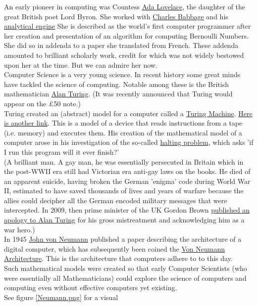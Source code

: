 \documentclass{article}
\begin{document}
An early pioneer in computing was Countess \href{https://en.wikipedia.org/wiki/Ada_Lovelace}{Ada Lovelace}, the daughter of the great British poet Lord Byron.  She worked with \href{https://en.wikipedia.org/wiki/Charles_Babbage}{Charles Babbage} and his \href{https://en.wikipedia.org/wiki/Analytical_Engine}{analytical engine}  She is described as the world's first computer programmer after her creation and presentation of an algorithm for computing Bernoulli Numbers.  She did so in addenda to a paper she translated from French.  These addenda amounted to brilliant scholarly work, credit for which was not widely bestowed upon her at the time.  But we can admire her now.
\\
Computer Science is a very young science.  In recent history some great minds have tackled the science of computing.  Notable among these is the British mathematician \href{https://www.britannica.com/biography/Alan-Turing}{Alan Turing}.  (It was recently announced that Turing would appear on the £50 note.)
\\
Turing created an (abstract) model for a computer called a \href{https://en.wikipedia.org/wiki/Turing_machine}{Turing Machine}. \href{https://www.cl.cam.ac.uk/projects/raspberrypi/tutorials/turing-machine/one.html}{Here is another link}.  This is a model of a device that reads instructions from a tape (i.e. memory) and executes them.  His creation of the mathematical model of a computer arose in his investigation of the so-called \href{https://en.wikipedia.org/wiki/Halting_problem}{halting problem}, which asks 'if I run this program will it ever finish?'
\\
(A brilliant man.  A gay man, he was essentially persecuted in Britain which in the post-WWII era still had Victorian era anti-gay laws on the books.  He died of an apparent suicide, having broken the German 'enigma' code during World War II, estimated to have saved thousands of lives and years of warfare because the allies could decipher all the German encoded military messages that were intercepted.  In 2009, then prime minister of the UK Gordon Brown \href{https://www.telegraph.co.uk/news/politics/gordon-brown/6170112/Gordon-Brown-Im-proud-to-say-sorry-to-a-real-war-hero.html}{published an apology to Alan Turing} for his gross mistreatment and acknowledging him as a war hero.)
\\
In 1945 \href{https://en.wikipedia.org/wiki/John_von_Neumann}{John von Neumann} published a paper describing the architecture of a digital computer, which has subsequently been coined the \href{https://en.wikipedia.org/wiki/Von_Neumann_architecture}{Von Neumann Architecture}.  This is the architecture that computers adhere to to this day.
\\
Such mathematical models were created so that early Computer Scientists (who were essentially all Mathematicians) could explore the science of computers and computing even without effective computers yet existing.
\\
See figure \ref{Neumann.png} for a visual
\end{document}
